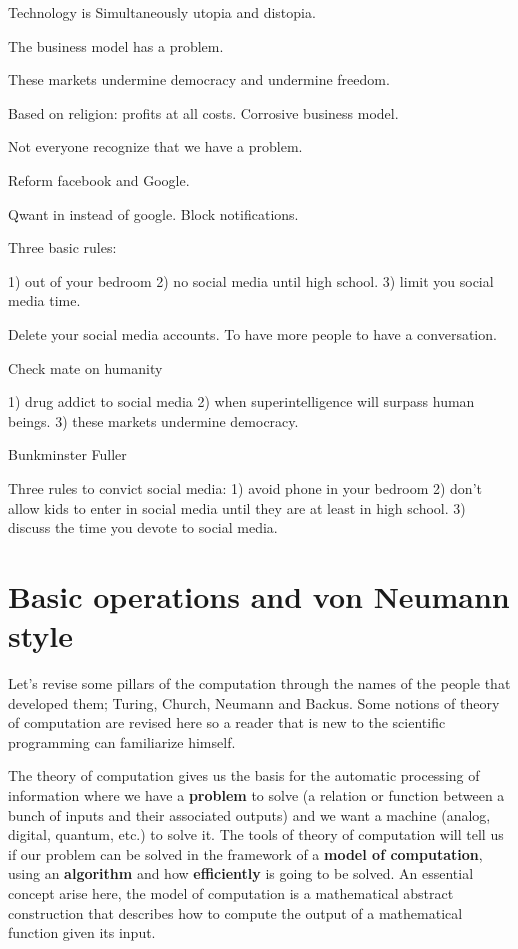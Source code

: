   
  Technology is Simultaneously utopia and distopia. 
  
  The business model has a problem. 
  
  These markets undermine democracy and undermine freedom. 
  
  Based on religion: profits at all costs. Corrosive business model.  
  
  Not everyone recognize that we have a problem. 
  
  Reform facebook and Google. 
  
  Qwant in instead of google. Block notifications. 
  
  
  Three basic rules:
  
  1) out of your bedroom
  2) no social media until high school. 
  3) limit you social media time. 
  
  
  Delete your social media accounts. To have more people to have a conversation. 
  
  
  Check mate on humanity 
  
  1) drug addict to social media 
  2) when superintelligence will surpass human beings. 
  3) these markets undermine democracy. 
  
  Bunkminster Fuller 
  
  
  Three rules to convict social media:
  1) avoid phone in your bedroom
  2) don't allow kids to enter in social media until they are at least in high school. 
  3) discuss the time you devote to social media. 
  
  
\section{Basic operations and von Neumann style} 

\renewcommand{\home}{./Fortran/sources/Foundations/Roots}


Let's revise some pillars of the computation through the names of the people 
that developed them; Turing, Church, Neumann and Backus. 
Some notions of theory of computation are revised here so a reader that is new 
to the scientific programming can familiarize himself. 

The theory of computation gives us the basis for the automatic processing of information where we have a \textbf{problem} to solve (a 
relation or function between a bunch of inputs and their associated outputs) and we want a machine (analog, digital, quantum, etc.) to solve 
it. 
The tools of theory of computation will tell us if our problem can be solved in the framework of a \textbf{model of computation}, using an 
\textbf{algorithm} and how \textbf{efficiently} is going to be solved. 
An essential concept arise here, the model of computation is a mathematical abstract construction that describes how to compute the output of 
a mathematical function given its input. 

